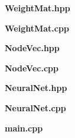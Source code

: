 \documentclass[14pt]{article}
\begin{document}
\begin{flushleft}
	\textbf{WeightMat.hpp}

	\textbf{WeightMat.cpp}


	\newpage
	\textbf{NodeVec.hpp}

	\textbf{NodeVec.cpp}


	\newpage
	\textbf{NeuralNet.hpp}

	\textbf{NeuralNet.cpp}


	\newpage
	\textbf{main.cpp}

\end{flushleft}
\end{document}
